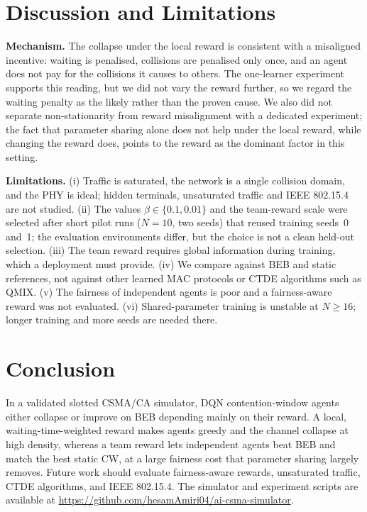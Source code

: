 \documentclass[conference]{IEEEtran}
\begin{document}
\section{Discussion and Limitations}
\textbf{Mechanism.} The collapse under the local reward is consistent with a misaligned incentive: waiting is penalised, collisions are penalised only once, and an agent does not pay for the collisions it causes to others. The one-learner experiment supports this reading, but we did not vary the reward further, so we regard the waiting penalty as the likely rather than the proven cause. We also did not separate non-stationarity from reward misalignment with a dedicated experiment; the fact that parameter sharing alone does not help under the local reward, while changing the reward does, points to the reward as the dominant factor in this setting.

\textbf{Limitations.} (i) Traffic is saturated, the network is a single collision domain, and the PHY is ideal; hidden terminals, unsaturated traffic and IEEE 802.15.4 are not studied. (ii) The values $\beta\in\{0.1,0.01\}$ and the team-reward scale were selected after short pilot runs ($N{=}10$, two seeds) that reused training seeds~0 and~1; the evaluation environments differ, but the choice is not a clean held-out selection. (iii) The team reward requires global information during training, which a deployment must provide. (iv) We compare against BEB and static references, not against other learned MAC protocols or CTDE algorithms such as QMIX. (v) The fairness of independent agents is poor and a fairness-aware reward was not evaluated. (vi) Shared-parameter training is unstable at $N\ge 16$; longer training and more seeds are needed there.

\section{Conclusion}
In a validated slotted CSMA/CA simulator, DQN contention-window agents either collapse or improve on BEB depending mainly on their reward. A local, waiting-time-weighted reward makes agents greedy and the channel collapse at high density, whereas a team reward lets independent agents beat BEB and match the best static CW, at a large fairness cost that parameter sharing largely removes. Future work should evaluate fairness-aware rewards, unsaturated traffic, CTDE algorithms, and IEEE 802.15.4. The simulator and experiment scripts are available at \url{https://github.com/hesamAmiri04/ai-csma-simulator}.
\end{document}
